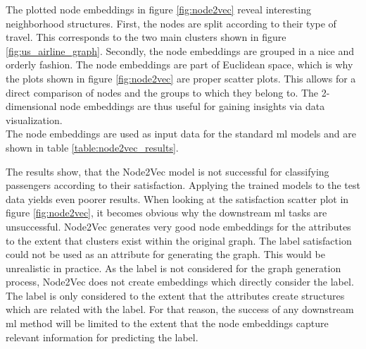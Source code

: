   \noindent The plotted node embeddings in figure \ref{fig:node2vec} reveal 
  interesting neighborhood structures. First, the nodes are split according to
  their type of travel. This corresponds to the two main clusters shown in
  figure \ref{fig:us_airline_graph}. Secondly, the node embeddings are grouped 
  in a nice and orderly fashion. The node embeddings are part of Euclidean
  space, which is why the plots shown in figure \ref{fig:node2vec} are proper
  scatter plots. This allows for a direct comparison of nodes and the groups to
  which they belong to. The 2-dimensional node embeddings are thus useful for
  gaining insights via data visualization.\\

  \noindent The node embeddings are used as input data for the standard \acs{ml} 
  models and are shown in table \ref{table:node2vec_results}.

  \begin{table}[h]
    \centering
    \caption{Node2Vec Classification Results}
    \label{table:node2vec_results}
  \end{table}

  \noindent The results show, that the Node2Vec model is not successful for
  classifying passengers according to their satisfaction. Applying the trained
  models to the test data yields even poorer results. When looking at the
  satisfaction scatter plot in figure \ref{fig:node2vec}, it becomes obvious why
  the downstream \acs{ml} tasks are unsuccessful. Node2Vec generates very good 
  node embeddings for the attributes to the extent that clusters exist within 
  the original graph. The label satisfaction could not be used as an attribute 
  for generating the graph. This would be unrealistic in practice. As the label 
  is not considered for the graph generation process, Node2Vec does not create 
  embeddings which directly consider the label. The label is only considered to 
  the extent that the attributes create structures which are related with the 
  label. For that reason, the success of any downstream \acs{ml} method will be 
  limited to the extent that the node embeddings capture relevant information 
  for predicting the label. \\

